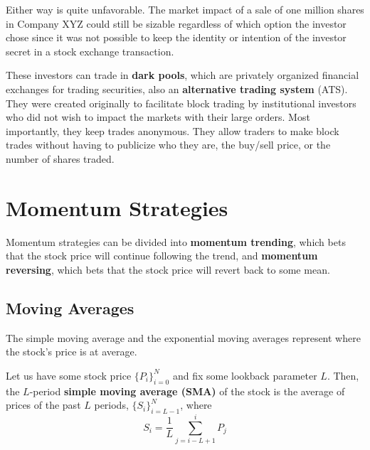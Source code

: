 \documentclass{article}
\begin{document}
    Either way is quite unfavorable. The market impact of a sale of one million shares in Company XYZ could still be sizable regardless of which option the investor chose since it was not possible to keep the identity or intention of the investor secret in a stock exchange transaction. 

    These investors can trade in \textbf{dark pools}, which are privately organized financial exchanges for trading securities, also an \textbf{alternative trading system} (ATS). They were created originally to facilitate block trading by institutional investors who did not wish to impact the markets with their large orders. Most importantly, they keep trades anonymous. They allow traders to make block trades without having to publicize who they are, the buy/sell price, or the number of shares traded. 

\section{Momentum Strategies}

  Momentum strategies can be divided into \textbf{momentum trending}, which bets that the stock price will continue following the trend, and \textbf{momentum reversing}, which bets that the stock price will revert back to some mean. 

  \subsection{Moving Averages}

    The simple moving average and the exponential moving averages represent where the stock's price is at average. 

    \begin{definition}
      \label{def:simple-moving-average}
      Let us have some stock price $\{P_i\}_{i=0}^N$ and fix some lookback parameter $L$. Then, the $L$-period \textbf{simple moving average (SMA)} of the stock is the average of prices of the past $L$ periods, $\{S_i\}_{i=L-1}^N$, where 
      \begin{equation}
        S_i = \frac{1}{L} \sum_{j=i-L + 1}^i P_j
      \end{equation}
    \end{definition}
\end{document}
